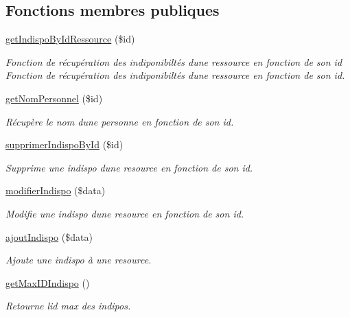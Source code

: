 \subsection*{Fonctions membres publiques}
\begin{DoxyCompactItemize}
\item 
\hyperlink{class_m___etre_indispo_aafdc093cd06c61f5453a109d1943581f}{get\+Indispo\+By\+Id\+Ressource} (\$id)
\begin{DoxyCompactList}\small\item\em Fonction de récupération des indiponibiltés d\textquotesingle{}une ressource en fonction de son id  Fonction de récupération des indiponibiltés d\textquotesingle{}une ressource en fonction de son id. \end{DoxyCompactList}\item 
\hyperlink{class_m___etre_indispo_a40059d26a7f0497922c82566db3b2cbf}{get\+Nom\+Personnel} (\$id)
\begin{DoxyCompactList}\small\item\em Récupère le nom d\textquotesingle{}une personne en fonction de son id. \end{DoxyCompactList}\item 
\hyperlink{class_m___etre_indispo_a46bb4b8f17279202d251337ef4fe81be}{supprimer\+Indispo\+By\+Id} (\$id)
\begin{DoxyCompactList}\small\item\em Supprime une indispo d\textquotesingle{}une resource en fonction de son id. \end{DoxyCompactList}\item 
\hyperlink{class_m___etre_indispo_a8bb19557ad068f3bfec862fb0bf7e9de}{modifier\+Indispo} (\$data)
\begin{DoxyCompactList}\small\item\em Modifie une indispo d\textquotesingle{}une resource en fonction de son id. \end{DoxyCompactList}\item 
\hyperlink{class_m___etre_indispo_a07544241a34c628237f7cb76f9fe71a4}{ajout\+Indispo} (\$data)
\begin{DoxyCompactList}\small\item\em Ajoute une indispo à une resource. \end{DoxyCompactList}\item 
\hyperlink{class_m___etre_indispo_acbc7981e408765b330d104a1cd5c0881}{get\+Max\+I\+D\+Indispo} ()
\begin{DoxyCompactList}\small\item\em Retourne l\textquotesingle{}id max des indipos. \end{DoxyCompactList}\end{DoxyCompactItemize}


